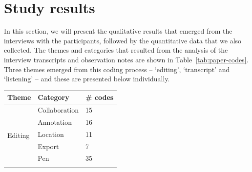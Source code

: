 \section{Study results}\label{sec:paper-results}

In this section, we will present the qualitative results that emerged from the interviews with the participants,
followed by the quantitative data that we also collected.  The themes and categories that resulted from the analysis of
the interview transcripts and observation notes are shown in Table~\ref{tab:paper-codes}. Three themes emerged from
this coding process -- `editing', `transcript' and `listening' -- and these are presented below individually. 

\begin{table}[h]
  \centering
  {\small
    \begin{tabular}{|l|l|l|} %
      \hline
      \textbf{Theme} & \textbf{Category} & \textbf{\# codes} \\ \hline
      \multirow{8}{*}{Editing}
      & Collaboration & 15 \\ \cline{2-3} %
      & Annotation & 16 \\ \cline{2-3} %
      & Location & 11 \\ \cline{2-3} %
      & Export & 7 \\ \cline{2-3} %
      & Pen & 35 \\ \cline{2-3} %

\end{tabular}}
\end{table}
